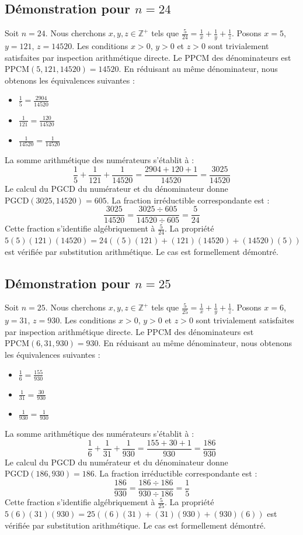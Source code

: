 \documentclass[12pt,a4paper]{article}
\begin{document}
\subsection{Démonstration pour $n = 24$}
Soit $n = 24$. Nous cherchons $x, y, z \in \mathbb{Z}^{+}$ tels que $\frac{5}{24} = \frac{1}{x} + \frac{1}{y} + \frac{1}{z}$.
Posons $x = 5$, $y = 121$, $z = 14520$.
Les conditions $x > 0$, $y > 0$ et $z > 0$ sont trivialement satisfaites par inspection arithmétique directe.
Le PPCM des dénominateurs est $\text{PPCM}(5, 121, 14520) = 14520$.
En réduisant au même dénominateur, nous obtenons les équivalences suivantes :
\begin{itemize}
    \item $\frac{1}{5} = \frac{2904}{14520}$
    \item $\frac{1}{121} = \frac{120}{14520}$
    \item $\frac{1}{14520} = \frac{1}{14520}$
\end{itemize}
La somme arithmétique des numérateurs s'établit à :
$$ \frac{1}{5} + \frac{1}{121} + \frac{1}{14520} = \frac{2904 + 120 + 1}{14520} = \frac{3025}{14520} $$
Le calcul du PGCD du numérateur et du dénominateur donne $\text{PGCD}(3025, 14520) = 605$.
La fraction irréductible correspondante est :
$$ \frac{3025}{14520} = \frac{3025 \div 605}{14520 \div 605} = \frac{5}{24} $$
Cette fraction s'identifie algébriquement à $\frac{5}{24}$.
La propriété $5(5)(121)(14520) = 24((5)(121) + (121)(14520) + (14520)(5))$ est vérifiée par substitution arithmétique.
Le cas est formellement démontré.

\subsection{Démonstration pour $n = 25$}
Soit $n = 25$. Nous cherchons $x, y, z \in \mathbb{Z}^{+}$ tels que $\frac{5}{25} = \frac{1}{x} + \frac{1}{y} + \frac{1}{z}$.
Posons $x = 6$, $y = 31$, $z = 930$.
Les conditions $x > 0$, $y > 0$ et $z > 0$ sont trivialement satisfaites par inspection arithmétique directe.
Le PPCM des dénominateurs est $\text{PPCM}(6, 31, 930) = 930$.
En réduisant au même dénominateur, nous obtenons les équivalences suivantes :
\begin{itemize}
    \item $\frac{1}{6} = \frac{155}{930}$
    \item $\frac{1}{31} = \frac{30}{930}$
    \item $\frac{1}{930} = \frac{1}{930}$
\end{itemize}
La somme arithmétique des numérateurs s'établit à :
$$ \frac{1}{6} + \frac{1}{31} + \frac{1}{930} = \frac{155 + 30 + 1}{930} = \frac{186}{930} $$
Le calcul du PGCD du numérateur et du dénominateur donne $\text{PGCD}(186, 930) = 186$.
La fraction irréductible correspondante est :
$$ \frac{186}{930} = \frac{186 \div 186}{930 \div 186} = \frac{1}{5} $$
Cette fraction s'identifie algébriquement à $\frac{5}{25}$.
La propriété $5(6)(31)(930) = 25((6)(31) + (31)(930) + (930)(6))$ est vérifiée par substitution arithmétique.
Le cas est formellement démontré.
\end{document}
